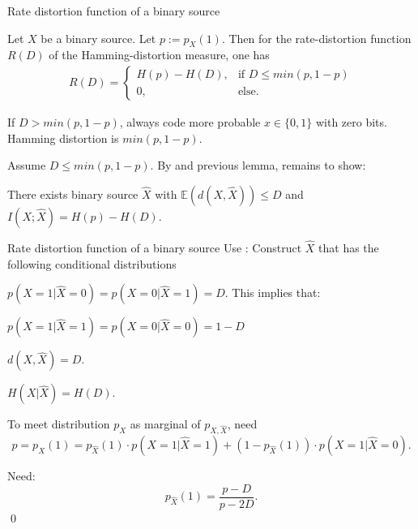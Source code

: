\begin{frame}{Rate distortion function of a binary source}
\begin{theorem}
Let $X$ be a binary source. Let $p:=p_X(1)$. Then for the rate-distortion function $R(D)$ of the Hamming-distortion measure, one has
\begin{align*}
R(D)=\begin{cases}H(p)-H(D),&\text{if $D\leq min(p,1-p)$} \\ 0, &\text{else.}\end{cases}
\end{align*}
\end{theorem}
\bit
\item If $D>min(p,1-p)$, always code more probable $x\in\{0,1\}$ with zero bits. Hamming distortion is $min(p,1-p)$.
\item Assume  $D\leq min(p,1-p)$. By  and previous lemma, remains to show:  

There exists binary source $\hat{X}$ with 
$\mathbb{E}(d(X,\hat{X}))\leq D$ and $I(X;\hat{X})=H(p)-H(D)$. 
\eit
\end{frame}

\begin{frame}{Rate distortion function of a binary source} 
Use : Construct $\hat{X}$ that has the following conditional distributions
\bit
\item 
$p(X=1|\hat{X}=0)=p(X=0|\hat{X}=1)=D$.
\eit 
This implies that:
\bit
\item 
$p(X=1|\hat{X}=1)=p(X=0|\hat{X}=0)=1-D$ 
\item $d(X,\hat{X})=D$.
\item $H(X|\hat{X})=H(D)$.
\eit 

To meet distribution $p_X$ as marginal of $p_{X,\hat{X}}$, need
\[
p=p_X(1)=p_{\hat{X}}(1)\cdot p(X=1|\hat{X}=1) + (1-p_{\hat{X}}(1))\cdot p(X=1|\hat{X}=0).
\] 
\bit 
\item [\iarrow] Need: 
\[
p_{\hat{X}}(1)=\frac{p-D}{p-2D}.
\]
\qed  
\eit

\end{frame}


